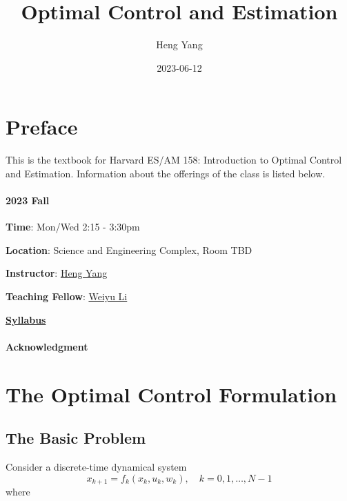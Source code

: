 \documentclass[
]{book}
\title{Optimal Control and Estimation}
\author{Heng Yang}
\date{2023-06-12}
\theoremstyle{definition}
\theoremstyle{definition}
\theoremstyle{definition}
\theoremstyle{definition}
\theoremstyle{remark}
\begin{document}
\maketitle

{
\setcounter{tocdepth}{1}
\tableofcontents
}
\hypertarget{preface}{%
\chapter*{Preface}\label{preface}}

This is the textbook for Harvard ES/AM 158: Introduction to Optimal Control and Estimation. Information about the offerings of the class is listed below.

\hypertarget{fall}{%
\subsubsection*{2023 Fall}\label{fall}}

\textbf{Time}: Mon/Wed 2:15 - 3:30pm

\textbf{Location}: Science and Engineering Complex, Room TBD

\textbf{Instructor}: \href{https://hankyang.seas.harvard.edu/}{Heng Yang}

\textbf{Teaching Fellow}: \href{https://scholar.harvard.edu/weiyuli/home}{Weiyu Li}

\href{https://docs.google.com/document/d/1q8_jB5dLx9jHOBi3DQ48Vv2E243ocGCGm_H0mJuOojM/edit?usp=sharing}{\textbf{Syllabus}}

\hypertarget{acknowledgment}{%
\subsubsection*{Acknowledgment}\label{acknowledgment}}

\hypertarget{formulation}{%
\chapter{The Optimal Control Formulation}\label{formulation}}

\hypertarget{the-basic-problem}{%
\section{The Basic Problem}\label{the-basic-problem}}

Consider a discrete-time dynamical system
\begin{equation}
x_{k+1} = f_k (x_k, u_k, w_k), \quad k =0,1,\dots,N-1
\label{eq:discrete-time-dynamics}
\end{equation}
where
\end{document}
